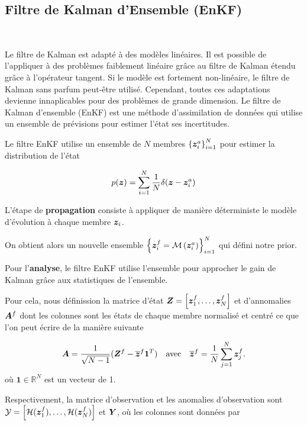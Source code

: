 \subsection{Filtre de Kalman d'Ensemble (EnKF)}~\label{sec:enkf}

Le filtre de Kalman est adapté à des modèles linéaires. Il est possible de l'appliquer à des problèmes faiblement linéaire grâce au filtre de Kalman étendu grâce à l'opérateur tangent. Si le modèle est fortement non-linéaire, le filtre de Kalman sans parfum peut-être utilisé. Cependant, toutes ces adaptations devienne innaplicables pour des problèmes de grande dimension.
Le filtre de Kalman d'ensemble (EnKF) est une méthode d'assimilation de données qui utilise un ensemble de prévisions pour estimer l'état ses incertitudes.

Le filtre EnKF utilise un ensemble de $N$ membres $\left\{\bm {\bm{z}}^a_i \right\}_{i=1}^N$ pour estimer la distribution de l'état

\begin{equation*}
    p(\bm{z}) = \sum_{i=1}^{N} \frac{1}{N} \delta(\bm z - \bm z^a_i)
\end{equation*}

L'étape de \textbf{propagation} consiste à appliquer de manière déterministe le modèle d'évolution à chaque membre $\bm z_i$.

On obtient alors un nouvelle ensemble $\left\{\bm {\bm{z}}^f_{i}= \mathcal M\left(\bm z_i^a\right) \right\}_{i=1}^N$ qui défini notre prior.

Pour l'\textbf{analyse}, le filtre EnKF utilise l'ensemble pour approcher le gain de Kalman grâce aux statistiques de l'ensemble.

Pour cela, nous définission la matrice d'état $\bm{Z} = \left[\bm{z}^f_1, \dots, \bm{z}^f_N\right]$ et d'annomalies $\bm A^f$ dont les colonnes sont les états de chaque membre normalisé et centré ce que l'on peut écrire de la manière suivante

\begin{equation*}
    \bm A = \frac{1}{\sqrt{N - 1}}(\bm Z^f - \overline{\bm{z}}^f \bm{1}^T) \quad \text{avec} \quad \overline{\bm{z}}^f = \frac{1}{N} \sum_{j=1}^{N} \bm{z}_j^f.
\end{equation*}où $\bm{1} \in \mathbb{R}^N$ est un vecteur de 1.

Respectivement, la matrice d'observation et les anomalies d'observation sont $\mathcal Y = \left[\mathcal{H}(\bm{z}_1^f), \dots, \mathcal{H}(\bm{z}_N^f)\right]$ et $\bm Y$, où les colonnes sont données par

